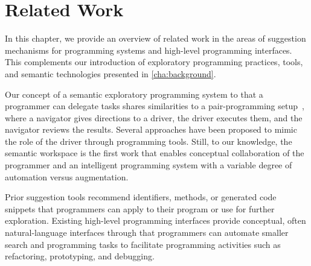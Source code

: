 
\chapter{Related Work}
\label{cha:related_work}

In this chapter, we provide an overview of related work in the areas of suggestion mechanisms for programming systems and high-level programming interfaces.
This complements our introduction of exploratory programming practices, tools, and semantic technologies presented in \cref{cha:background}.

Our concept of a semantic exploratory programming system to that a programmer can delegate tasks shares similarities to a pair-programming setup~\cite{beck2000extreme}, where a navigator gives directions to a driver, the driver executes them, and the navigator reviews the results.
Several approaches have been proposed to mimic the role of the driver through programming tools.
Still, to our knowledge, the semantic workspace is the first work that enables conceptual collaboration of the programmer and an intelligent programming system with a variable degree of automation versus augmentation.


\begin{summary}
	Prior suggestion tools recommend identifiers, methods, or generated code snippets that programmers can apply to their program or use for further exploration.
	Existing high-level programming interfaces provide conceptual, often natural-language interfaces through that programmers can automate smaller search and programming tasks to facilitate programming activities such as refactoring, prototyping, and debugging.
\end{summary}
